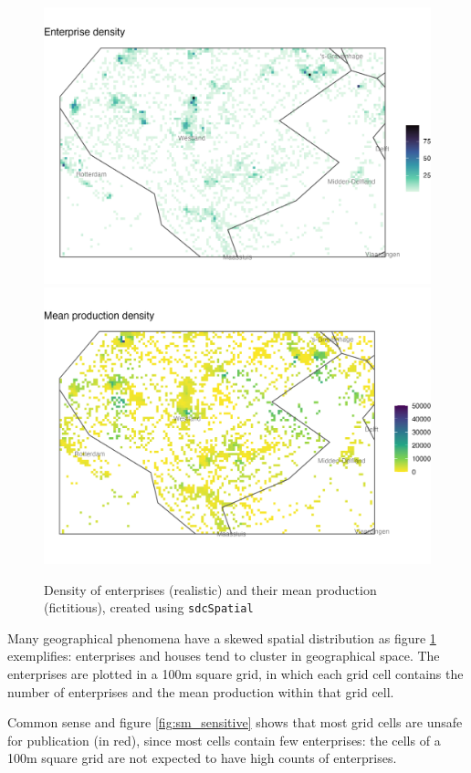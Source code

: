 \begin{figure}[H]
    \centering
    \includegraphics[width=.8\linewidth]{figures/Smoothing/enterprise_density.png} \\
    \includegraphics[width=.8\linewidth]{figures/Smoothing/mean_production_density.png}
    \caption{Density of enterprises (realistic) and their mean production (fictitious), created using \texttt{sdcSpatial} \citep{sdcSpatial_2022}}
    \label{fig:sm_density}
\end{figure}

Many geographical phenomena have
a skewed spatial distribution as figure \ref{fig:sm_density} exemplifies: enterprises and houses tend to cluster in 
geographical space. The enterprises are plotted in a 100m square grid, in which each grid cell contains the number of enterprises and the mean production within that grid cell. 

Common sense and figure \ref{fig:sm_sensitive} shows that most grid cells are unsafe for publication (in red), since most cells contain few enterprises: the cells of a 100m square grid are not expected to have high counts of enterprises.


